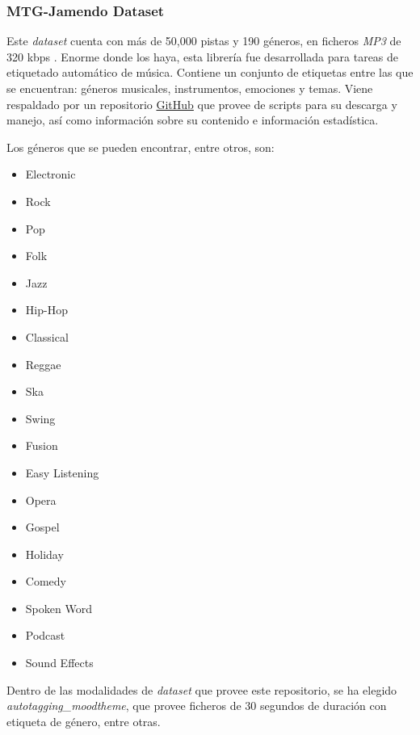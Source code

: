 \subsubsection{MTG-Jamendo Dataset}

Este \emph{dataset} cuenta con más de 50,000 pistas y 190 géneros, en ficheros \emph{MP3} de 320 kbps . Enorme donde los haya, esta librería fue desarrollada para tareas de etiquetado automático de música. Contiene un conjunto de etiquetas entre las que se encuentran: géneros musicales, instrumentos, emociones y temas. Viene respaldado por un repositorio \href{https://github.com/MTG/mtg-jamendo-dataset}{GitHub} que provee de scripts para su descarga y manejo, así como información sobre su contenido e información estadística.

Los géneros que se pueden encontrar, entre otros, son:
\begin{multicols}{4}
\begin{itemize}
    \item Electronic
    \item Rock
    \item Pop
    \item Folk
    \item Jazz
    \item Hip-Hop
    \item Classical
    \item Reggae
    \item Ska
    \item Swing
    \item Fusion
    \item Easy Listening
    \item Opera
    \item Gospel
    \item Holiday
    \item Comedy
    \item Spoken Word
    \item Podcast
    \item Sound Effects
\end{itemize}
\end{multicols}

Dentro de las modalidades de \emph{dataset} que provee este repositorio, se ha elegido \emph{autotagging\_moodtheme}, que provee ficheros de 30 segundos de duración con etiqueta de género, entre otras.


